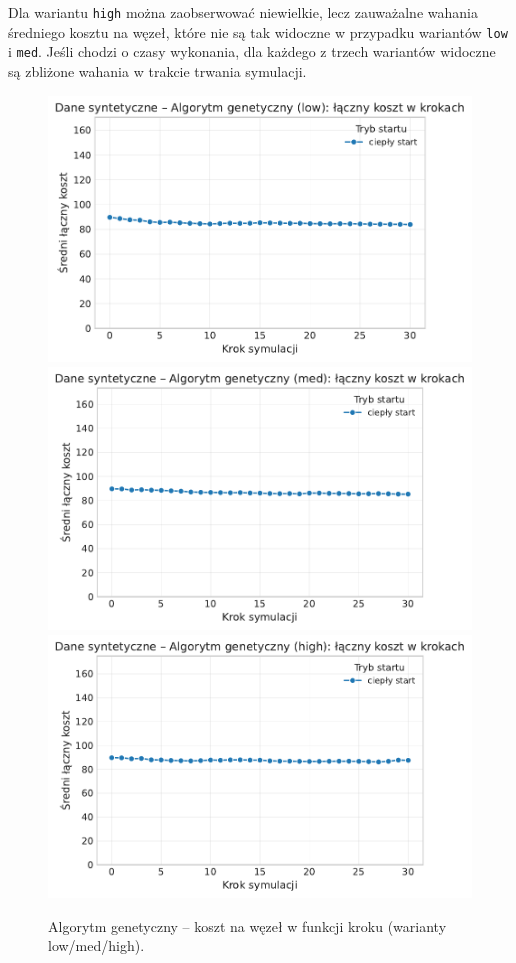 Dla wariantu \texttt{high} można zaobserwować niewielkie, lecz zauważalne wahania średniego kosztu na węzeł, które nie są tak widoczne w przypadku wariantów \texttt{low} i \texttt{med}. Jeśli chodzi o czasy wykonania, dla każdego z trzech wariantów widoczne są zbliżone wahania w trakcie trwania symulacji.

\begin{figure}[H]
  \centering
  \includegraphics[width=0.32\linewidth]{assets/figures/dynamic/synthetic/synthetic_algorytm_genetyczny_cost_over_steps_low.pdf}
  \includegraphics[width=0.32\linewidth]{assets/figures/dynamic/synthetic/synthetic_algorytm_genetyczny_cost_over_steps_med.pdf}
  \includegraphics[width=0.32\linewidth]{assets/figures/dynamic/synthetic/synthetic_algorytm_genetyczny_cost_over_steps_high.pdf}
  \caption{Algorytm genetyczny -- koszt na węzeł w funkcji kroku (warianty low/med/high).}
  \label{fig:dyn-synth-genetic-cost}
\end{figure}

